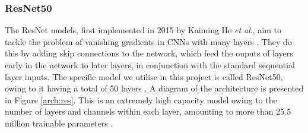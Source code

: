 \documentclass[12pt]{article}
\begin{document}
\subsubsection{ResNet50}
The ResNet models, first implemented in 2015 by Kaiming He \textit{et al}., aim to tackle the problem of vanishing gradients in CNNs with many layers \cite{He15}. They do this by adding skip connections to the network, which feed the ouputs of layers early in the network to later layers, in conjunction with the standard sequential layer inputs. The specific model we utilise in this project is called ResNet50, owing to it having a total of 50 layers \cite{He15}. A diagram of the architecture is presented in Figure \ref{arch:res}. This is an extremely high capacity model owing to the number of layers and channels within each layer, amounting to more than 25.5 million trainable parameters \cite{He15}.
\end{document}
